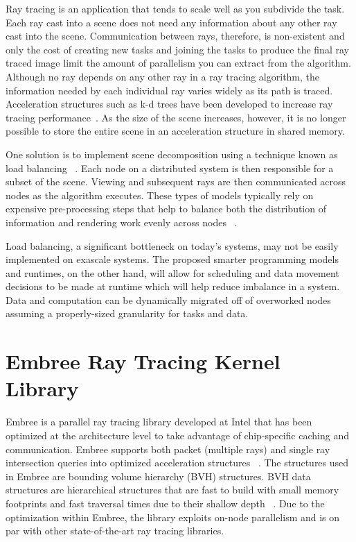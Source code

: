 Ray tracing is an application that tends to scale well as you subdivide the 
task.  Each ray cast into a scene does not need any information about any other 
ray cast into the scene.  Communication between rays, therefore, is non-existent 
and only the cost of creating new tasks and joining the tasks to produce the 
final ray traced image limit the amount of parallelism you can extract from the
algorithm.  Although no ray depends on any other ray in a ray tracing algorithm,
the information needed by each individual ray varies widely as its path is
traced.  Acceleration structures such as k-d trees have been developed to
increase ray tracing performance~\cite{article-bentley,
book-chalmers}.  As the size of the scene increases, however, it
is no longer possible to store the entire scene in an acceleration structure
in shared memory.

One solution is to implement scene decomposition using a technique known as
load balancing ~\cite{article-scherson, proceedings-brownlee}. Each node on a
distributed system is then responsible for a subset of the scene. Viewing and
subsequent rays are then communicated across nodes as the algorithm executes.
These types of models typically rely on expensive pre-processing steps that
help to balance both the distribution of information and rendering work evenly
across nodes ~\cite{proceedings-navratil, article-navratil}.

Load balancing, a significant bottleneck on today's systems, may not be easily 
implemented on exascale systems. The proposed smarter programming models and 
runtimes, on the other hand, will allow for scheduling and data movement 
decisions to be made at runtime which will help reduce imbalance in a system. 
Data and computation can be dynamically migrated off of overworked nodes 
assuming a properly-sized granularity for tasks and data.

\section{Embree Ray Tracing Kernel Library}
\label{sec:embree}
Embree is a parallel ray tracing library developed at Intel that has been 
optimized at the architecture level to take advantage of chip-specific caching 
and communication.  Embree supports both packet (multiple rays) and single ray 
intersection queries into optimized acceleration structures
~\cite{article-wald, proceedings-woop}. The structures used in Embree are
bounding volume hierarchy (BVH) structures. BVH data structures are hierarchical structures that
are fast to build with small memory footprints and fast traversal times due to
their shallow depth ~\cite{article-wald, proceedings-woop}.  Due to the
optimization within Embree, the library exploits on-node parallelism and is on par with other
state-of-the-art ray tracing libraries. 
